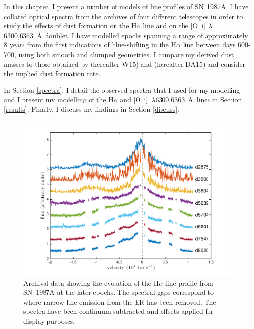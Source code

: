 In this chapter, I present a number of models of line profiles of SN~1987A. I have collated optical spectra from the archives of four different telescopes in order to study the effects of dust formation on 
the H$\alpha$ line and on the [O~{\sc i}]~$\lambda$6300,6363~\AA\ doublet.  
I have modelled epochs spanning a range of approximately 8 years from the first 
indications of blue-shifting in the H$\alpha$ line between days 600-700, using 
both smooth and clumped geometries.  I compare my derived dust masses to 
those obtained by \citet{Wesson2015} (hereafter W15) and \citet{Dwek2015} (hereafter DA15) and consider the implied dust formation rate. 

In Section \ref{spectra}, I detail the observed spectra that I used for 
my modelling and I present my modelling of the 
H$\alpha$ and [O~{\sc i}]~$\lambda$6300,6363~\AA\ lines in 
Section \ref{results}.  Finally, I discuss my findings in Section 
\ref{discuss}.
    


\begin{figure}
\centering
\includegraphics[trim =45 10 45 15,clip=true,scale=0.7]{chapters/chapter5/images/Ha_evol_late_1col.pdf}
\caption{Archival data showing the evolution of the H$\alpha$
line profile from SN~1987A at the later epochs. The spectral gaps 
correspond to where narrow line emission from the ER has been 
removed. The spectra have been continuum-subtracted and offsets applied 
for display purposes.}
\label{Ha_evol_late}
\end{figure}





